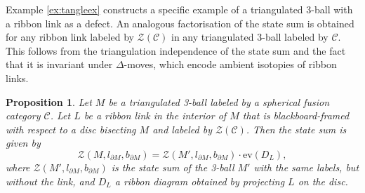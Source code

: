 \documentclass[1.5pt, a4paper]{article}
\newcommand{\mac}{\mathcal C}
\newtheorem{proposition}[theorem]{Proposition}
\begin{document}
Example \ref{ex:tangleex} constructs a specific example of a triangulated  3-ball with a ribbon link as a defect. An analogous factorisation of the state sum is obtained for any  ribbon link labeled by $\mathcal Z(\mac)$   in any triangulated 3-ball labeled by $\mac$. This follows from the triangulation independence of the state sum and the fact that it is invariant under $\Delta$-moves, which encode ambient isotopies of ribbon links.


\begin{proposition}\label{prop:ribbonball} Let $M$ be a triangulated 3-ball labeled by a spherical fusion category $\mac$.  Let $L$ be a ribbon link in the interior of $M$ that is blackboard-framed with respect to a disc bisecting $M$ and labeled by $\mathcal Z(\mac)$. Then the state sum is given by
$$
\mathcal Z(M,l_{\partial M}, b_{\partial M})=\mathcal Z(M', l_{\partial M}, b_{\partial M})\cdot \mathrm{ev}(D_L),
$$
where $\mathcal Z(M', l_{\partial M}, b_{\partial M})$ is the state sum of the 3-ball $M'$  with the same labels, but  without the link, and $D_L$ a ribbon diagram obtained by projecting $L$ on the disc.
\end{proposition}
\end{document}

